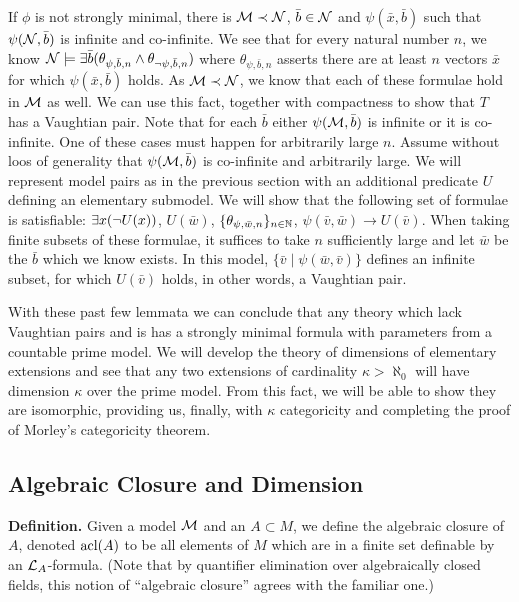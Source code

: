 If \(\phi\) is not strongly minimal, there is \(\mathcal{M} \prec \mathcal{N}\), \(\bar{b} \in \mathcal{N}\) and \(\psi(\bar{x}, \bar{b})\) such that \(\psi(\mathcal{N}, \bar{b})\) is infinite and co-infinite. 
We see that for every natural number \(n\), we know \(\mathcal{N} \models \exists \bar{b} (\theta_{\psi, \bar{b}, n} \land \theta_{\neg \psi, \bar{b}, n})\) where \(\theta_{\psi, \bar{b},n}\) asserts there are at least \(n\) vectors \(\bar{x}\) for which \(\psi(\bar{x}, \bar{b})\) holds. 
As \(\mathcal{M} \prec \mathcal{N}\), we know that each of these formulae hold in \(\mathcal{M}\) as well. 
We can use this fact, together with compactness to show that \(T\) has a Vaughtian pair.
Note that for each \(\bar{b}\) either \(\psi(\mathcal{M}, \bar{b})\) is infinite or it is co-infinite. 
One of these cases must happen for arbitrarily large \(n\).  %
Assume without loos of generality that \(\psi(\mathcal{M}, \bar{b})\) is co-infinite and arbitrarily large. 
We will represent model pairs as in the previous section with an additional predicate \(U\) defining an elementary submodel. 
We will show that the following set of formulae is satisfiable: 
\(\exists x (\neg U(x))\), \(U(\bar{w})\), \(\{\theta_{\psi, \bar{w}, n}\}_{n\in \mathbb{N}}\), \(\psi(\bar{v}, \bar{w}) \to U(\bar{v})\). 
When taking finite subsets of these formulae, it suffices to take \(n\) sufficiently large and let \(\bar{w}\) be the \(\bar{b}\) which we know exists.
In this model, \(\{\bar{v}\mid\psi(\bar{w}, \bar{v})\}\) defines an infinite subset, for which \(U(\bar{v})\) holds, in other words, a Vaughtian pair. %

With these past few lemmata we can conclude that any theory which lack Vaughtian pairs and is \omst has a strongly minimal formula with parameters from a countable prime model. 
We will develop the theory of dimensions of elementary extensions and see that any two extensions of cardinality \(\kappa > \aleph_0\) will have dimension \(\kappa\) over the prime model.
From this fact, we will be able to show they are isomorphic, providing us, finally, with \(\kappa\) categoricity and completing the proof of Morley's categoricity theorem. 

\subsection{Algebraic Closure and Dimension}

\textbf{Definition.} Given a model \(\mathcal{M}\) and an \(A \subset M\), we define the algebraic closure of \(A\), denoted \(\text{acl}(A)\) to be all elements of \(M\) which are in a finite set definable by an \(\mathcal{L}_A\)-formula. 
(Note that by quantifier elimination over algebraically closed fields, this notion of ``algebraic closure'' agrees with the familiar one.)


